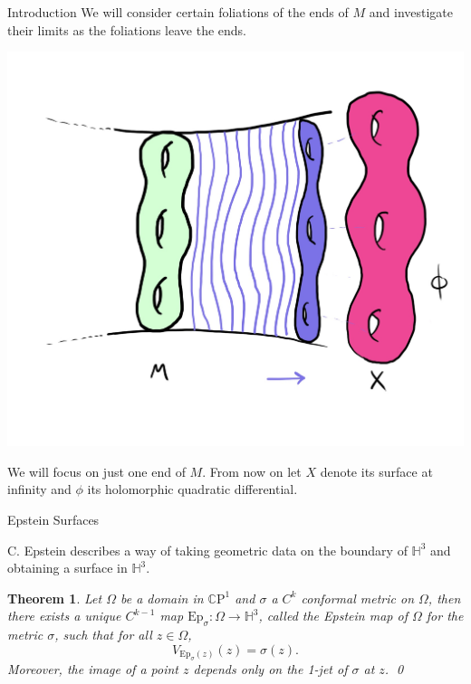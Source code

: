 \documentclass[professionalfont]{beamer}
\newcommand{\CP}{\mathbb{C}\mathrm{P}}
\renewcommand{\H}{\mathbb{H}}
\newtheorem{thm}{Theorem}[section]
\begin{document}
\begin{frame}{Introduction}
We will consider certain foliations of the ends of $M$ and investigate their limits as the foliations leave the ends. 

\begin{center}
\includegraphics[scale=0.09]{Foliation.jpg}
\end{center}


We will focus on just one end of $M$. From now on let $X$ denote its surface at infinity and $\phi$ its holomorphic quadratic differential.


\end{frame}




\begin{frame}{Epstein Surfaces}

C. Epstein describes a way of taking geometric data on the boundary of $\H^3$ and obtaining a surface in $\H^3$.
\newline

\begin{thm}
Let $\Omega$ be a domain in $\CP^1$  and $\sigma$ a $C^k$ conformal metric on $\Omega$, then there exists a unique $C^{k-1}$ map $\mathrm{Ep}_\sigma : \Omega \to \H^3$, called the Epstein map of $\Omega$ for the metric $\sigma$, such that for all $z \in \Omega$,
\[
V_{\mathrm{Ep}_\sigma(z)}(z) = \sigma(z).
\]
Moreover, the image of a point $z$ depends only on the 1-jet of $\sigma$ at $z$.
\label{epstein-map-def} \qed
\end{thm}

\end{frame}
\end{document}
